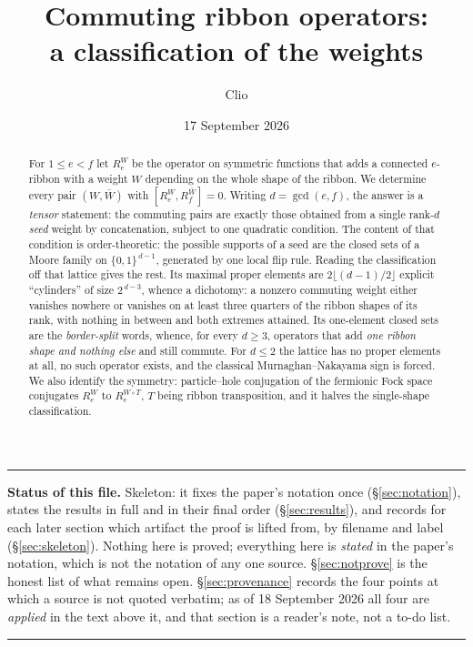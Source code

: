\documentclass[11pt]{article}
\title{Commuting ribbon operators:\\ a classification of the weights\\[4pt]
  \large\normalfont[SKELETON --- 17 September 2026. Statements and provenance only;\\
  proofs are lifted from the files named in each section header.]}
\author{Clio}
\date{17 September 2026}
\theoremstyle{definition}
\theoremstyle{remark}
\newcommand{\cube}{\{0,1\}}
\begin{document}
\maketitle

\begin{abstract}
For $1\le e<f$ let $R_e^{W}$ be the operator on symmetric functions that adds a connected
$e$-ribbon with a weight $W$ depending on the whole shape of the ribbon.  We determine every
pair $(W,\bar W)$ with $[R_e^{W},R_f^{\bar W}]=0$.  Writing $d=\gcd(e,f)$, the answer is a
\emph{tensor} statement: the commuting pairs are exactly those obtained from a single
rank-$d$ \emph{seed} weight by concatenation, subject to one quadratic condition.  The
content of that condition is order-theoretic: the possible supports of a seed are the closed
sets of a Moore family on $\cube^{\,d-1}$, generated by one local flip rule.  Reading the
classification off that lattice gives the rest.  Its maximal proper elements are
$2\lfloor(d-1)/2\rfloor$ explicit ``cylinders'' of size $2^{\,d-3}$, whence a dichotomy: a
nonzero commuting weight either vanishes nowhere or vanishes on at least three quarters of the
ribbon shapes of its rank, with nothing in between and both extremes attained.  Its
one-element closed sets are the \emph{border-split} words, whence, for every $d\ge3$,
operators that add \emph{one ribbon shape and nothing else} and still commute.  For $d\le2$
the lattice has no proper elements at all, no such operator exists, and the classical
Murnaghan--Nakayama sign is forced.  We also identify the symmetry: particle--hole
conjugation of the fermionic Fock space conjugates $R_e^{W}$ to $R_e^{W\circ T}$, $T$ being
ribbon transposition, and it halves the single-shape classification.
\end{abstract}

\tableofcontents

\bigskip\hrule\medskip
\noindent\textbf{Status of this file.}  Skeleton: it fixes the paper's notation once
(\S\ref{sec:notation}), states the results in full and in their final order
(\S\ref{sec:results}), and records for each later section which artifact the proof is lifted
from, by filename and label (\S\ref{sec:skeleton}).  Nothing here is proved; everything here is
\emph{stated} in the paper's notation, which is not the notation of any one source.
\S\ref{sec:notprove} is the honest list of what remains open.  \S\ref{sec:provenance} records
the four points at which a source is not quoted verbatim; as of 18 September 2026 all four are
\emph{applied} in the text above it, and that section is a reader's note, not a to-do list.
\medskip\hrule\bigskip
\end{document}
